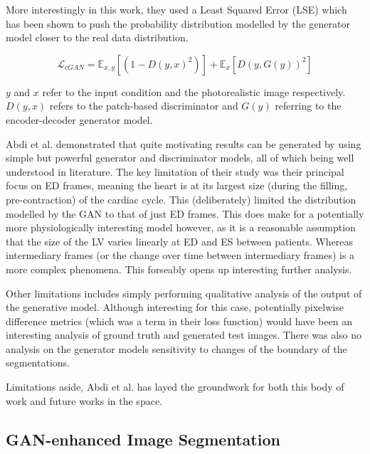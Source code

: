 More interestingly in this work, they used a Least Squared Error (LSE) which has
been shown to push the probability distribution modelled by the generator model
closer to the real data distribution. \newline

\begin{equation}
        \mathcal{L}_{cGAN} = \mathbb{E}_{x,y}[(1-D(y,x)^{2})] + \mathbb{E}_{x}[D(y,G(y))^2]
\end{equation}

$y$ and $x$ refer to the input condition and the photorealistic image
respectively. $D(y,x)$ refers to the patch-based discriminator and $G(y)$
referring to the encoder-decoder generator model. \newline

Abdi et al. demonstrated that quite motivating results can be generated by using
simple but powerful generator and discriminator models, all of which being well
understood in literature. The key limitation of their study was their principal
focus on ED frames, meaning the heart is at its largest size (during the
filling, pre-contraction) of the cardiac cycle. This (deliberately) limited the
distribution modelled by the GAN to that of just ED frames. This does make for a
potentially more physiologically interesting model however, as it is a
reasonable assumption that the size of the LV varies linearly at ED and ES
between patients. Whereas intermediary frames (or the change over time between
intermediary frames) is a more complex phenomena. This forseably opens up
interesting further analysis. \newline

Other limitations includes simply performing qualitative analysis of the output
of the generative model. Although interesting for this case, potentially
pixelwise difference metrics (which was a term in their loss function) would
have been an interesting analysis of ground truth and generated test images.
There was also no analysis on the generator models sensitivity to changes of the
boundary of the segmentations. \newline

Limitations aside, Abdi et al. has layed the groundwork for both this body of
work and future works in the space. \newline

\subsection{GAN-enhanced Image Segmentation}

